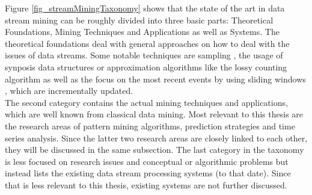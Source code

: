 Figure \ref{fig_streamMiningTaxonomy} shows that the state of the art in data stream mining can be roughly divided into three basic parts: Theoretical Foundations, Mining Techniques and Applications as well as Systems. The theoretical foundations deal with general approaches on how to deal with the issues of data streams. Some notable techniques are sampling \cite{manku1999random}, the usage of synposis data structures or approximation algorithms like the lossy counting algorithm \cite{manku2002approximate} as well as the focus on the most recent events by using sliding windows \cite{gama2010knowledge}, which are incrementally updated.\\
The second category contains the actual mining techniques and applications, which are well known from classical data mining. Most relevant to this thesis are the research areas of pattern mining algorithms, prediction strategies and time series analysis. Since the latter two research areas are closely linked to each other, they will be discussed in the same subsection.
The last category in the taxonomy is less focused on research issues and conceptual or algorithmic problems but instead lists the existing data stream processing systems (to that date). Since that is less relevant to this thesis, existing systems are not further discussed.

